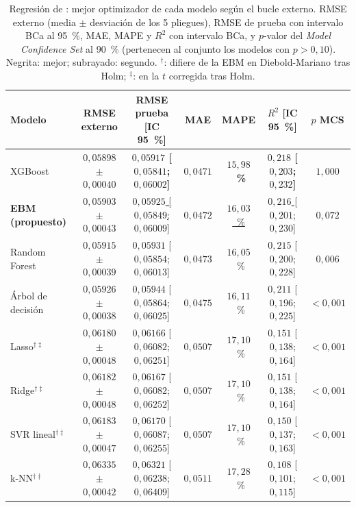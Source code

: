 \begin{table}[tbp]
  \centering\scriptsize\setlength{\tabcolsep}{1.5pt}
  \caption{Regresión de \cp: mejor optimizador de cada modelo según el bucle externo. RMSE externo (media $\pm$ desviación de los 5 pliegues), RMSE de prueba con intervalo BCa al 95~\%, MAE, MAPE y $R^2$ con intervalo BCa, y $p$-valor del \emph{Model Confidence Set} al 90~\% (pertenecen al conjunto los modelos con $p > 0{,}10$). Negrita: mejor; subrayado: segundo. $^{\dagger}$: difiere de la EBM en Diebold-Mariano tras Holm; $^{\ddagger}$: en la $t$ corregida tras Holm.}
  \label{tab:regresion}
  \begin{tabular}{@{}l c c c c c c@{}}
    \toprule
    Modelo & RMSE externo & RMSE prueba [IC 95~\%] & MAE & MAPE & $R^2$ [IC 95~\%] & $p$ MCS \\
    \midrule
    XGBoost & {\boldmath\textbf{$0{,}05898$ $\pm$ $0{,}00040$}} & {\boldmath\textbf{$0{,}05917$ [$0{,}05841$; $0{,}06002$]}} & {\boldmath\textbf{$0{,}0471$}} & {\boldmath\textbf{$15{,}98$~\%}} & {\boldmath\textbf{$0{,}218$ [$0{,}203$; $0{,}232$]}} & $1{,}000$ \\
    \textbf{EBM (propuesto)} & \underline{$0{,}05903$ $\pm$ $0{,}00043$} & \underline{$0{,}05925$ [$0{,}05849$; $0{,}06009$]} & \underline{$0{,}0472$} & \underline{$16{,}03$~\%} & \underline{$0{,}216$ [$0{,}201$; $0{,}230$]} & $0{,}072$ \\
    Random Forest & $0{,}05915$ $\pm$ $0{,}00039$ & $0{,}05931$ [$0{,}05854$; $0{,}06013$] & $0{,}0473$ & $16{,}05$~\% & $0{,}215$ [$0{,}200$; $0{,}228$] & $0{,}006$ \\
    Árbol de decisión & $0{,}05926$ $\pm$ $0{,}00038$ & $0{,}05944$ [$0{,}05864$; $0{,}06025$] & $0{,}0475$ & $16{,}11$~\% & $0{,}211$ [$0{,}196$; $0{,}225$] & $<0{,}001$ \\
    Lasso$^{\dagger\ddagger}$ & $0{,}06180$ $\pm$ $0{,}00048$ & $0{,}06166$ [$0{,}06082$; $0{,}06251$] & $0{,}0507$ & $17{,}10$~\% & $0{,}151$ [$0{,}138$; $0{,}164$] & $<0{,}001$ \\
    Ridge$^{\dagger\ddagger}$ & $0{,}06182$ $\pm$ $0{,}00048$ & $0{,}06167$ [$0{,}06082$; $0{,}06252$] & $0{,}0507$ & $17{,}10$~\% & $0{,}151$ [$0{,}138$; $0{,}164$] & $<0{,}001$ \\
    SVR lineal$^{\dagger\ddagger}$ & $0{,}06183$ $\pm$ $0{,}00047$ & $0{,}06170$ [$0{,}06087$; $0{,}06255$] & $0{,}0507$ & $17{,}10$~\% & $0{,}150$ [$0{,}137$; $0{,}163$] & $<0{,}001$ \\
    k-NN$^{\dagger\ddagger}$ & $0{,}06335$ $\pm$ $0{,}00042$ & $0{,}06321$ [$0{,}06238$; $0{,}06409$] & $0{,}0511$ & $17{,}28$~\% & $0{,}108$ [$0{,}101$; $0{,}115$] & $<0{,}001$ \\
    \bottomrule
  \end{tabular}
\end{table}
